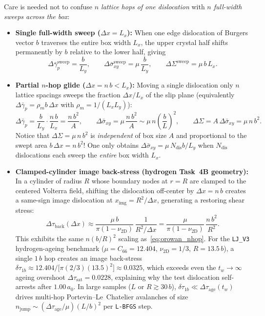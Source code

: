 \documentclass[11pt,a4paper]{article}
\newcommand{\code}[1]{\texttt{#1}}
\newcommand{\dS}{\Delta\Sigma}
\newcommand{\dsigbar}{\Delta\bar{\sigma}_{xy}}
\begin{document}
Care is needed not to confuse \emph{$n$ lattice hops of one dislocation} with \emph{$n$ full-width sweeps across the box}:
\begin{itemize}[nosep]
  \item \textbf{Single full-width sweep ($\Delta x = L_x$):} When one edge dislocation of Burgers vector $b$ traverses the entire box width $L_x$, the upper crystal half shifts permanently by $b$ relative to the lower half, giving
  \begin{equation}
  \Delta\bar{\gamma}_p^{\mathrm{sweep}} = \frac{b}{L_y},
  \qquad
  \dsigbar^{\mathrm{sweep}} = \mu\,\frac{b}{L_y},
  \qquad
  \dS^{\mathrm{sweep}} = \mu\,b\,L_x.
  \end{equation}
  \item \textbf{Partial $n$-hop glide ($\Delta x = n\,b < L_x$):} Moving a single dislocation only $n$ lattice spacings sweeps the fraction $\Delta x / L_x$ of the slip plane (equivalently $\Delta\bar{\gamma}_p = \rho_m b\,\Delta x$ with $\rho_m = 1/(L_x L_y)$):
  \begin{equation}
  \label{eq:orowan_nhop}
  \Delta\bar{\gamma}_p = \frac{b}{L_y}\cdot\frac{n\,b}{L_x} = \frac{n\,b^2}{A},
  \qquad
  \dsigbar = \mu\,\frac{n\,b^2}{A} \sim \mu\,n\left(\frac{b}{L}\right)^{\!2},
  \qquad
  \dS = A\,\dsigbar = \mu\,n\,b^2.
  \end{equation}
  Notice that $\dS = \mu\,n\,b^2$ is \emph{independent} of box size $A$ and proportional to the swept area $b\,\Delta x = n\,b^2$! One only obtains $\dsigbar = \mu\,N_{\mathrm{dis}} b / L_y$ when $N_{\mathrm{dis}}$ dislocations each sweep the \emph{entire} box width $L_x$.
  \item \textbf{Clamped-cylinder image back-stress (hydrogen Task~4B geometry):} In a cylinder of radius $R$ whose boundary nodes at $r=R$ are clamped to the centered Volterra field, shifting the dislocation off-center by $\Delta x = n\,b$ creates a same-sign image dislocation at $x_{\mathrm{img}} = R^2/\Delta x$, generating a restoring shear stress:
  \begin{equation}
  \Delta\tau_{\mathrm{back}}(\Delta x) \approx \frac{\mu\,b}{\pi(1-\nu_{2\mathrm{D}})}\,\frac{1}{R^2/\Delta x}
  = \frac{\mu}{\pi(1-\nu_{2\mathrm{D}})}\,\frac{n\,b^2}{R^2}.
  \end{equation}
  This exhibits the same $n(b/R)^2$ scaling as~\eqref{eq:orowan_nhop}. For the \code{LJ\_V3} hydrogen-ageing benchmark ($\mu = C_{66} = 12.404$, $\nu_{2\mathrm{D}} = 1/3$, $R = 13.5\,b$), a single $1\,b$ hop creates an image back-stress $\delta\tau_{1b} \approx 12.404 / \big[\pi(2/3)(13.5)^2\big] \approx 0.0325$, which exceeds even the $t_w\to\infty$ ageing overshoot $\Delta\tau_{\mathrm{sat}} = 0.0228$, explaining why the test dislocation self-arrests after $1.00\,a_0$. In large samples ($L$ or $R \gtrsim 30\,b$), $\delta\tau_{1b} \ll \Delta\tau_{\mathrm{age}}(t_w)$ drives multi-hop Portevin--Le~Chatelier avalanches of size $n_{\mathrm{jump}} \sim (\Delta\tau_{\mathrm{age}}/\mu)(L/b)^2$ per \code{L-BFGS} step.
\end{itemize}
\end{document}
